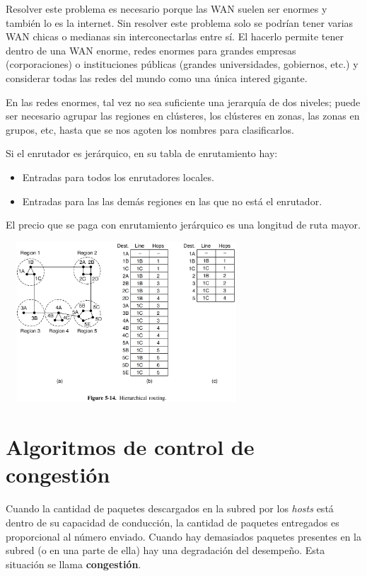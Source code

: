 	\par Resolver este problema es necesario porque las WAN suelen ser enormes
y también lo es la internet. Sin resolver este problema solo se podrían tener varias WAN chicas o medianas sin interconectarlas entre sí. El hacerlo permite tener dentro de una WAN enorme, redes enormes para grandes empresas (corporaciones) o instituciones públicas (grandes universidades, gobiernos, etc.) y considerar todas las redes del mundo como una única intered gigante.

	\par En las redes enormes, tal vez no sea suficiente una jerarquía de dos niveles; puede ser necesario agrupar las regiones en clústeres, los clústeres en zonas, las zonas en grupos, etc, hasta que se nos agoten los nombres para clasificarlos.
	
	\par Si el enrutador es jerárquico, en su tabla de enrutamiento hay:
		\begin{itemize}
			\item Entradas para todos los enrutadores locales.
			\item Entradas para las las demás regiones en las que no está el enrutador.
		\end{itemize}
	
	\par El precio que se paga con enrutamiento jerárquico es una longitud de ruta mayor.

	\begin{center}
			\includegraphics[width=9cm, height=6cm]{./imagenes/jerarquico.png} 
	\end{center}

\section{Algoritmos de control de congestión}

	\par Cuando la cantidad de paquetes descargados en la subred por los \textit{hosts} está dentro de su capacidad de conducción, la cantidad de paquetes entregados es proporcional al número enviado. Cuando hay demasiados paquetes presentes en la subred (o en una parte de ella) hay una degradación del desempeño. Esta situación se llama \textbf{congestión}.

